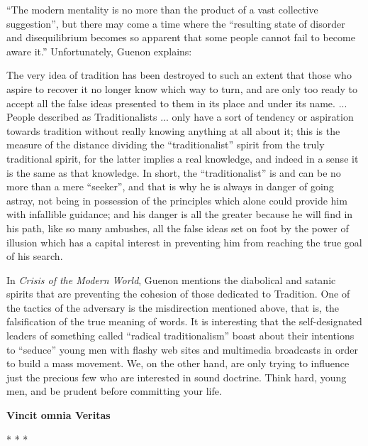 ``The modern mentality is no more than the product of a vast collective suggestion'', but there may come a time where the ``resulting state of disorder and disequilibrium becomes so apparent that some people cannot fail to become aware it.'' Unfortunately, Guenon explains:

\begin{quotex}
The very idea of tradition has been destroyed to such an extent that those who aspire to recover it no longer know which way to turn, and are only too ready to accept all the false ideas presented to them in its place and under its name. ... People described as Traditionalists ... only have a sort of tendency or aspiration towards tradition without really knowing anything at all about it; this is the measure of the distance dividing the ``traditionalist'' spirit from the truly traditional spirit, for the latter implies a real knowledge, and indeed in a sense it is the same as that knowledge. In short, the ``traditionalist'' is and can be no more than a mere ``seeker'', and that is why he is always in danger of going astray, not being in possession of the principles which alone could provide him with infallible guidance; and his danger is all the greater because he will find in his path, like so many ambushes, all the false ideas set on foot by the power of illusion which has a capital interest in preventing him from reaching the true goal of his search.
\end{quotex}


In \textit{Crisis of the Modern World}, Guenon mentions the diabolical and satanic spirits that are preventing the cohesion of those dedicated to Tradition. One of the tactics of the adversary is the misdirection mentioned above, that is, the falsification of the true meaning of words. It is interesting that the self-designated leaders of something called ``radical traditionalism'' boast about their intentions to ``seduce'' young men with flashy web sites and multimedia broadcasts in order to build a mass movement. We, on the other hand, are only trying to influence just the precious few who are interested in sound doctrine. Think hard, young men, and be prudent before committing your life.

\begin{center} \textbf{Vincit omnia Veritas} \end{center}




\begin{center}* * *\end{center}

